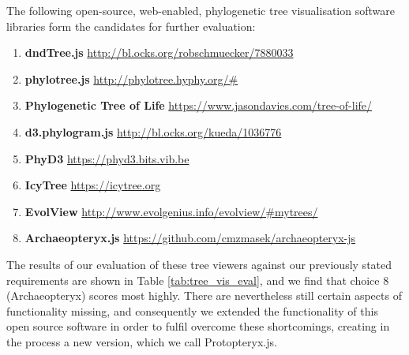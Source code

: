 \documentclass[12pt,a4paper]{article}
\begin{document}
The following open-source, web-enabled, phylogenetic tree visualisation software libraries form the candidates for further evaluation:

\singlespace
\begin{enumerate}
\item {\bf dndTree.js} \small \url{http://bl.ocks.org/robschmuecker/7880033} \normalsize
\item {\bf phylotree.js} \small \url{http://phylotree.hyphy.org/#} \normalsize
\item {\bf Phylogenetic Tree of Life} \small \url{https://www.jasondavies.com/tree-of-life/} \normalsize
\item {\bf d3.phylogram.js} \small \url{http://bl.ocks.org/kueda/1036776} \normalsize
\item {\bf PhyD3} \small \url{https://phyd3.bits.vib.be} \normalsize
\item {\bf IcyTree} \small \url{https://icytree.org} \normalsize
\item {\bf EvolView} \small \url{http://www.evolgenius.info/evolview/#mytrees/} \normalsize
\item {\bf Archaeopteryx.js} \small \url{https://github.com/cmzmasek/archaeopteryx-js} \normalsize
\end{enumerate}
\doublespace

The results of our evaluation of these tree viewers against our previously stated requirements are shown in Table \ref{tab:tree_vis_eval}, and we find that choice 8 (Archaeopteryx) scores most highly. There are nevertheless still certain aspects of functionality missing, and consequently we extended the functionality of this open source software in order to fulfil overcome these shortcomings, creating in the process a new version, which we call Protopteryx.js.\\
\end{document}
